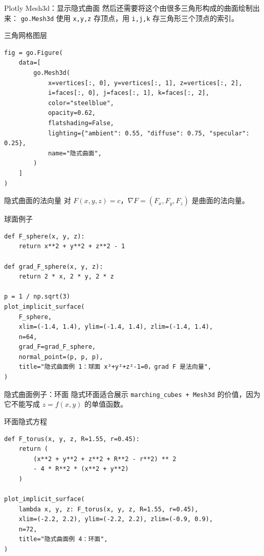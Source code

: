 \documentclass[aspectratio=169,11pt]{ctexbeamer}
\begin{document}
\begin{frame}[fragile]{Plotly Mesh3d：显示隐式曲面}
  然后还需要将这个由很多三角形构成的曲面绘制出来：
  \texttt{go.Mesh3d} 使用 \texttt{x,y,z} 存顶点，用 \texttt{i,j,k} 存三角形三个顶点的索引。

  \begin{block}{三角网格图层}
\begin{Verbatim}[fontsize=\tiny]
fig = go.Figure(
    data=[
        go.Mesh3d(
            x=vertices[:, 0], y=vertices[:, 1], z=vertices[:, 2],
            i=faces[:, 0], j=faces[:, 1], k=faces[:, 2],
            color="steelblue",
            opacity=0.62,
            flatshading=False,
            lighting={"ambient": 0.55, "diffuse": 0.75, "specular": 0.25},
            name="隐式曲面",
        )
    ]
)
\end{Verbatim}
  \end{block}
\end{frame}

\begin{frame}[fragile]{隐式曲面的法向量}
  对 \(F(x,y,z)=c\)，\(\nabla F=(F_x,F_y,F_z)\) 是曲面的法向量。

  \begin{block}{球面例子}
\begin{Verbatim}[fontsize=\tiny]
def F_sphere(x, y, z):
    return x**2 + y**2 + z**2 - 1

def grad_F_sphere(x, y, z):
    return 2 * x, 2 * y, 2 * z

p = 1 / np.sqrt(3)
plot_implicit_surface(
    F_sphere,
    xlim=(-1.4, 1.4), ylim=(-1.4, 1.4), zlim=(-1.4, 1.4),
    n=64,
    grad_F=grad_F_sphere,
    normal_point=(p, p, p),
    title="隐式曲面例 1：球面 x²+y²+z²-1=0，grad F 是法向量",
)
\end{Verbatim}
  \end{block}
\end{frame}

\begin{frame}[fragile]{隐式曲面例子：环面}
  隐式环面适合展示 \texttt{marching\_cubes + Mesh3d} 的价值，因为它不能写成 \(z=f(x,y)\) 的单值函数。

  \begin{block}{环面隐式方程}
\begin{Verbatim}[fontsize=\tiny]
def F_torus(x, y, z, R=1.55, r=0.45):
    return (
        (x**2 + y**2 + z**2 + R**2 - r**2) ** 2
        - 4 * R**2 * (x**2 + y**2)
    )

plot_implicit_surface(
    lambda x, y, z: F_torus(x, y, z, R=1.55, r=0.45),
    xlim=(-2.2, 2.2), ylim=(-2.2, 2.2), zlim=(-0.9, 0.9),
    n=72,
    title="隐式曲面例 4：环面",
)
\end{Verbatim}
  \end{block}
\end{frame}
\end{document}
